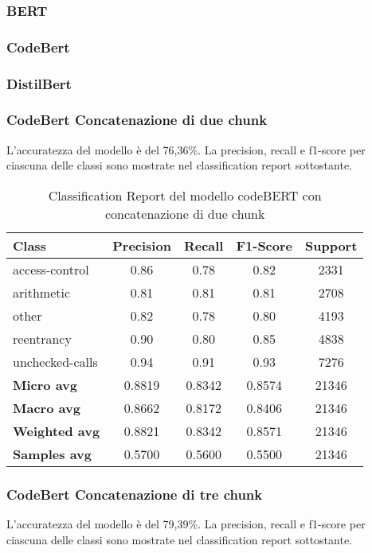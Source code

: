 \documentclass[../../Thesis.tex]{subfiles}
\begin{document}
\subsubsection{BERT}
\subsubsection{CodeBert}

\subsubsection{DistilBert}
\subsubsection{CodeBert Concatenazione di due chunk}
L'accuratezza del modello è del 76,36\%. La precision, recall e f1-score per ciascuna delle classi sono mostrate nel classification report sottostante.

\begin{table}[H]
\centering
\small
\begin{tabular}{lcccc}
\hline
\textbf{Class} & \textbf{Precision} & \textbf{Recall} & \textbf{F1-Score} & \textbf{Support} \\
\hline
access-control & 0.86 & 0.78 & 0.82 & 2331 \\
arithmetic & 0.81 & 0.81 & 0.81 & 2708 \\
other & 0.82 & 0.78 & 0.80 & 4193 \\
reentrancy & 0.90 & 0.80 & 0.85 & 4838 \\
unchecked-calls & 0.94 & 0.91 & 0.93 & 7276 \\
\hline
\textbf{Micro avg} & 0.8819 & 0.8342 & 0.8574 & 21346 \\
\textbf{Macro avg} & 0.8662 & 0.8172 & 0.8406 & 21346 \\
\textbf{Weighted avg} & 0.8821 & 0.8342 & 0.8571 & 21346 \\
\textbf{Samples avg} & 0.5700 & 0.5600 & 0.5500 & 21346 \\
\hline
\end{tabular}
\caption{Classification Report del modello codeBERT con concatenazione di due chunk}
\end{table}
\subsubsection{CodeBert Concatenazione di tre chunk}
L'accuratezza del modello è del 79,39\%. La precision, recall e f1-score per ciascuna delle classi sono mostrate nel classification report sottostante.
\end{document}
